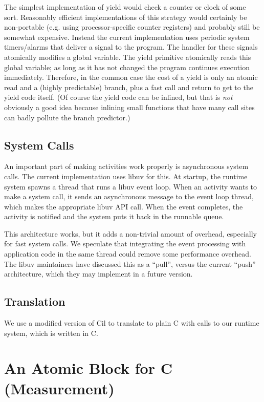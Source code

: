 \documentclass[acmsmall,anonymous,review]{acmart}\settopmatter{printfolios=true,printccs=false,printacmref=false}
\begin{document}
The simplest implementation of yield would check a counter or clock of some sort.
Reasonably efficient implementations of this strategy would certainly be non-portable (e.g. using processor-specific counter registers) and probably still be somewhat expensive.
Instead the current \charcoal{} implementation uses periodic system timers/alarms that deliver a signal to the program.
The handler for these signals atomically modifies a global variable.
The yield primitive atomically reads this global variable; as long as it has not changed the program continues execution immediately.
Therefore, in the common case the cost of a yield is only an atomic read and a (highly predictable) branch, plus a fast call and return to get to the yield code itself.
(Of course the yield code can be inlined, but that is \emph{not} obviously a good idea because inlining small functions that have many call sites can badly pollute the branch predictor.)

\subsection{System Calls}

An important part of making activities work properly is asynchronous system calls.
The current \charcoal{} implementation uses libuv for this.
At startup, the runtime system spawns a thread that runs a libuv event loop.
When an activity wants to make a system call, it sends an asynchronous message to the event loop thread, which makes the appropriate libuv API call.
When the event completes, the activity is notified and the system puts it back in the runnable queue.

This architecture works, but it adds a non-trivial amount of overhead, especially for fast system calls.
We speculate that integrating the event processing with application code in the same thread could remove some performance overhead.
The libuv maintainers have discussed this as a ``pull'', versus the current ``push'' architecture, which they may implement in a future version.

\subsection{Translation}

We use a modified version of Cil \cite{Necula2002} to translate \charcoal{} to plain C with calls to our runtime system, which is written in C.

\section{An Atomic Block for C (Measurement)}
\end{document}
